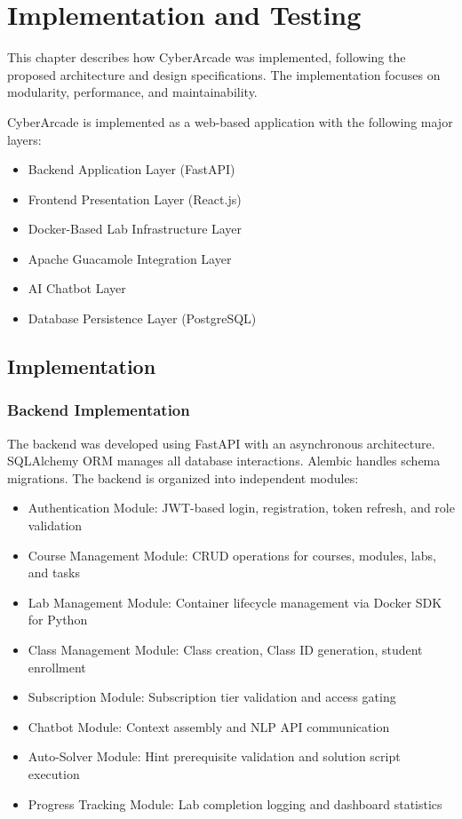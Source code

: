 \documentclass[12pt,a4paper]{report}
\begin{document}
\chapter{Implementation and Testing}

This chapter describes how CyberArcade was implemented, following the proposed architecture and design
specifications. The implementation focuses on modularity, performance, and maintainability.

CyberArcade is implemented as a web-based application with the following major layers:
\begin{itemize}
  \item Backend Application Layer (FastAPI)
  \item Frontend Presentation Layer (React.js)
  \item Docker-Based Lab Infrastructure Layer
  \item Apache Guacamole Integration Layer
  \item AI Chatbot Layer
  \item Database Persistence Layer (PostgreSQL)
\end{itemize}

\section{Implementation}

\subsection{Backend Implementation}

The backend was developed using FastAPI with an asynchronous architecture. SQLAlchemy ORM manages all
database interactions. Alembic handles schema migrations. The backend is organized into independent
modules:
\begin{itemize}
  \item Authentication Module: JWT-based login, registration, token refresh, and role validation
  \item Course Management Module: CRUD operations for courses, modules, labs, and tasks
  \item Lab Management Module: Container lifecycle management via Docker SDK for Python
  \item Class Management Module: Class creation, Class ID generation, student enrollment
  \item Subscription Module: Subscription tier validation and access gating
  \item Chatbot Module: Context assembly and NLP API communication
  \item Auto-Solver Module: Hint prerequisite validation and solution script execution
  \item Progress Tracking Module: Lab completion logging and dashboard statistics
\end{itemize}
\end{document}
